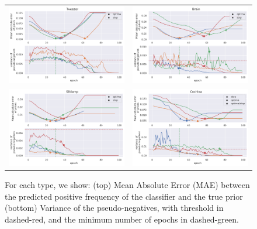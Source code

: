 \begin{figure}[t]
\caption{For each type, we show: (top) Mean Absolute Error (MAE) between the predicted positive frequency of the classifier and the true prior (bottom) Variance of the pseudo-negatives, with threshold in dashed-red, and the minimum number of epochs in dashed-green.}
\centering
\begin{tabular}{@{}cc@{}}
    \includegraphics[width=.5\textwidth]{pics/tweezer_priors.png} &
    \includegraphics[width=.5\textwidth]{pics/brain_priors.png} \\
    \includegraphics[width=.5\textwidth]{pics/slitlamp_priors.png} &
    \includegraphics[width=.5\textwidth]{pics/cochlea_priors.png} \\
\end{tabular}
\label{fig:converge}
\end{figure}

